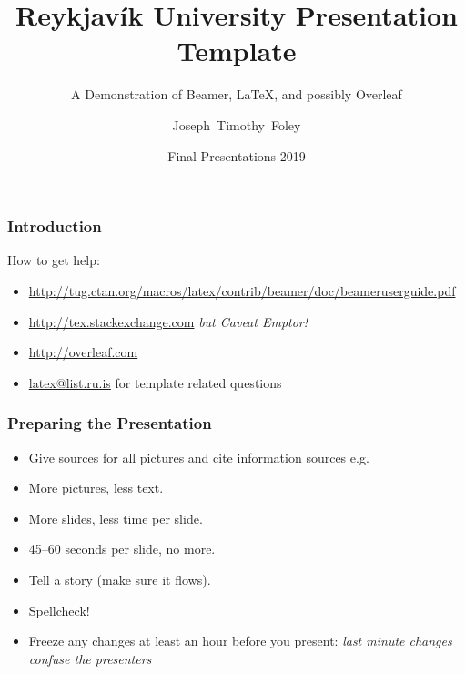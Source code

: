 \documentclass[aspectratio=169]{rubeamer}
\title[RU Presentation]{Reykjavík University Presentation Template}
\subtitle[demo]{A Demonstration of Beamer, \LaTeX, and possibly Overleaf}
\author[Foley]{Joseph~Timothy~Foley}
\institute[RU]{Reykjavík University}
\date[Final 2019]{Final Presentations 2019}%
\begin{document}
\begin{frame}[plain]%
  \titlepage

\end{frame}


\begin{frame}
  \frametitle{Introduction}
  How to get help:
  \begin{itemize}
  \item \url{http://tug.ctan.org/macros/latex/contrib/beamer/doc/beameruserguide.pdf}
  \item \url{http://tex.stackexchange.com}  {\it but Caveat Emptor!}\/
  \item \url{http://overleaf.com}
  \item \url{latex@list.ru.is} for template related questions
  \end{itemize}

\end{frame}

\begin{frame}
  \frametitle{Preparing the Presentation}
  \begin{itemize}
  \item Give sources for all pictures and cite information sources e.g. \cite{vossebeld2018customer}
  \item More pictures, less text.
  \item More slides, less time per slide.
  \item 45--60 seconds per slide, no more.
  \item Tell a story (make sure it flows).
  \item Spellcheck!
  \item Freeze any changes at least an hour before you present:  {\em last minute changes confuse the presenters}\/
  \end{itemize}
\end{frame}
\end{document}
